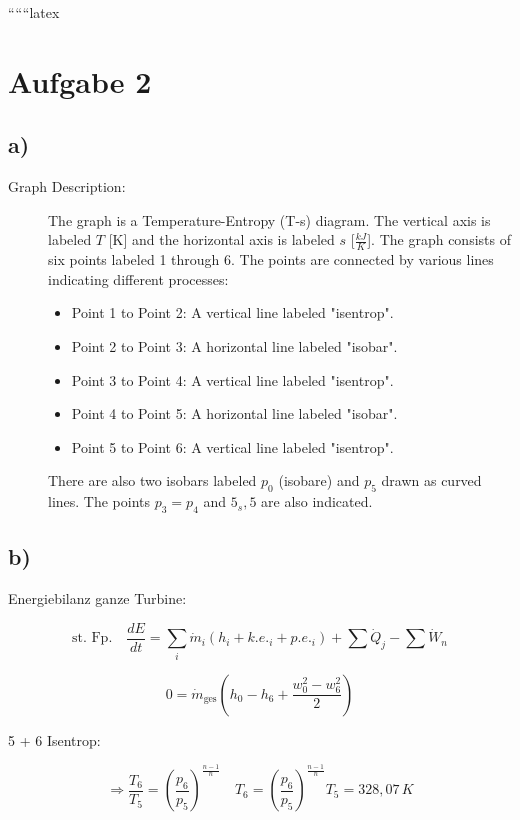
``````latex


\section*{Aufgabe 2}

\subsection*{a)}

\begin{description}
    \item[Graph Description:] The graph is a Temperature-Entropy (T-s) diagram. The vertical axis is labeled \( T \) [K] and the horizontal axis is labeled \( s \) [\(\frac{kJ}{K}\)]. The graph consists of six points labeled 1 through 6. The points are connected by various lines indicating different processes:
    \begin{itemize}
        \item Point 1 to Point 2: A vertical line labeled "isentrop".
        \item Point 2 to Point 3: A horizontal line labeled "isobar".
        \item Point 3 to Point 4: A vertical line labeled "isentrop".
        \item Point 4 to Point 5: A horizontal line labeled "isobar".
        \item Point 5 to Point 6: A vertical line labeled "isentrop".
    \end{itemize}
    There are also two isobars labeled \( p_0 \) (isobare) and \( p_5 \) drawn as curved lines. The points \( p_3 = p_4 \) and \( 5_s, 5 \) are also indicated.
\end{description}

\subsection*{b)}

Energiebilanz ganze Turbine:

\[
\text{st. Fp.} \quad \frac{dE}{dt} = \sum_i \dot{m}_i (h_i + k.e._i + p.e._i) + \sum \dot{Q}_j - \sum \dot{W}_n
\]

\[
0 = \dot{m}_{\text{ges}} (h_0 - h_6 + \frac{w_0^2 - w_6^2}{2})
\]

5 + 6 Isentrop:

\[
\Rightarrow \frac{T_6}{T_5} = \left( \frac{p_6}{p_5} \right)^{\frac{n-1}{n}} \quad T_6 = \left( \frac{p_6}{p_5} \right)^{\frac{n-1}{n}} T_5 = 328,07 \, K
\]

